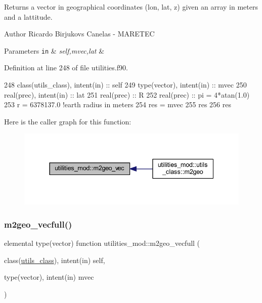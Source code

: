 Returns a vector in geographical coordinates (lon, lat, z) given an array in meters and a lattitude. 

\begin{DoxyAuthor}{Author}
Ricardo Birjukovs Canelas -\/ M\+A\+R\+E\+T\+EC 
\end{DoxyAuthor}

\begin{DoxyParams}[1]{Parameters}
\mbox{\tt in}  & {\em self,mvec,lat} & \\
\hline
\end{DoxyParams}


Definition at line 248 of file utilities.\+f90.


\begin{DoxyCode}
248     \textcolor{keywordtype}{class}(utils\_class), \textcolor{keywordtype}{intent(in)} :: self
249     \textcolor{keywordtype}{type}(vector), \textcolor{keywordtype}{intent(in)} :: mvec
250     \textcolor{keywordtype}{real(prec)}, \textcolor{keywordtype}{intent(in)} :: lat
251     \textcolor{keywordtype}{real(prec)} :: R
252     \textcolor{keywordtype}{real(prec)} :: pi = 4*atan(1.0)
253     r = 6378137.0 \textcolor{comment}{!earth radius in meters}
254     res = mvec
255     res%
256     res%
\end{DoxyCode}
Here is the caller graph for this function\+:\nopagebreak
\begin{figure}[H]
\begin{center}
\leavevmode
\includegraphics[width=337pt]{namespaceutilities__mod_a70b21b18c8633b7fd4c3057530d3f16f_icgraph}
\end{center}
\end{figure}
\mbox{\label{namespaceutilities__mod_a0b374564c3672b029cc10d238bf77d4b}} 
\subsubsection{\texorpdfstring{m2geo\+\_\+vecfull()}{m2geo\_vecfull()}}
{\footnotesize\ttfamily elemental type(vector) function utilities\+\_\+mod\+::m2geo\+\_\+vecfull (\begin{DoxyParamCaption}\item[{class(\mbox{\hyperlink{structutilities__mod_1_1utils__class}{utils\+\_\+class}}), intent(in)}]{self,  }\item[{type(vector), intent(in)}]{mvec }\end{DoxyParamCaption})\hspace{0.3cm}{\ttfamily [private]}}



